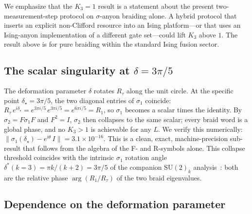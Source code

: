 \documentclass[aps,prx,reprint,amsmath,amssymb,floatfix,nofootinbib,superscriptaddress]{revtex4-2}
\begin{document}
We emphasize that the $K_{3} = 1$ result is a statement about the
present two-measurement-step protocol on $\sigma$-anyon braiding
alone. A hybrid protocol that inserts an explicit non-Clifford
resource into an Ising platform---or that uses an Ising-anyon
implementation of a different gate set---could lift $K_{3}$ above $1$.
The result above is for pure braiding within the standard Ising
fusion sector.

\subsection{The scalar singularity at $\delta = 3\pi/5$}
\label{sec:singularity}

The deformation parameter $\delta$ rotates $R_{\tau}$ along the unit
circle.
At the specific point $\delta_{\star} = 3\pi/5$, the two diagonal
entries of $\sigma_{1}$ coincide:
$R_{\tau} \, e^{i\delta_{\star}}
   = e^{3\pi i/5} \, e^{3\pi i/5}
   = e^{6\pi i/5}
   = R_{1}$,
so $\sigma_{1}$ becomes a scalar times the identity. By
$\sigma_{2} = F \sigma_{1} F$ and $F^{2} = I$, $\sigma_{2}$ then
collapses to the same scalar; every braid word is a global phase, and
no $K_{3} > 1$ is achievable for any $L$. We verify this numerically:
$\|\sigma_{1}(\delta_{\star}) - e^{i\theta}\,I\| = 3.1 \times 10^{-16}$.
This is a clean, exact, machine-precision sub-result that follows
from the algebra of the F- and R-symbols alone. This collapse
threshold coincides with the intrinsic $\sigma_{1}$ rotation angle
$\delta^{\ast}(k{=}3) = \pi k/(k+2) = 3\pi/5$ of the companion
$\mathrm{SU}(2)_{k}$ analysis~\cite{Sayim2026SU2k}: both are the
relative phase $\arg(R_{1}/R_{\tau})$ of the two braid eigenvalues.

\subsection{Dependence on the deformation parameter}
\label{sec:sector-fourier}
\end{document}
